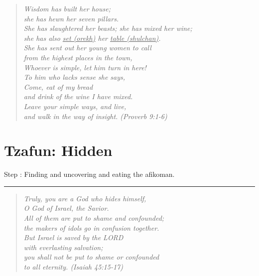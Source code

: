 \documentclass[10pt,oneside,footinclude=true,headinclude=true]{scrbook} %
\newcommand\quot[1]{
	\begin{quote}\textit{\small#1}\end{quote}
}
\newcommand{\drawimage}[4]{
	\makebox[0pt][s]{
		\raisebox{#1}[0pt][0pt]{
			\transparent{#2}\texttt{[image: \#4]}
		}
	}
}
\begin{document}
\quot{
Wisdom has built her house;\\
\hspace*{5mm}she has hewn her seven pillars.\\
She has slaughtered her beasts; she has mixed her wine;\\
\hspace*{5mm}she has also \underline{set (orekh)} her \underline{table (shulchan)}.\\
She has sent out her young women to call\\
\hspace*{5mm}from the highest places in the town,\\
Whoever is simple, let him turn in here!\\
\hspace*{5mm}To him who lacks sense she says,\\
Come, eat of my bread\\
\hspace*{5mm}and drink of the wine I have mixed.\\
Leave your simple ways, and live,\\
\hspace*{5mm}and walk in the way of insight. (Proverb 9:1-6)}

\chapter{Tzafun: Hidden}
\drawimage{-1cm}{0.1}{10cm}{tzafun}
\normalsize
Step \thechapter: Finding and uncovering and eating the afikoman.

\vspace{5mm}
\hrule
\vspace{5mm}

\quot{Truly, you are a God who hides himself,\\
\hspace*{5mm}O God of Israel, the Savior.\\
All of them are put to shame and confounded;\\
\hspace*{5mm}the makers of idols go in confusion together.\\
But Israel is saved by the LORD\\
\hspace*{5mm}with everlasting salvation;\\
you shall not be put to shame or confounded\\
\hspace*{5mm}to all eternity. (Isaiah 45:15-17)}
\end{document}
